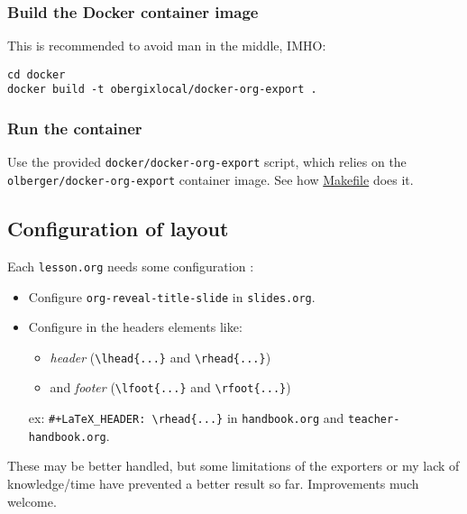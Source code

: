 \documentclass[a4paper]{article}
\begin{document}
\subsubsection{Build the Docker container image}
\label{sec:org113fa77}

This is recommended to avoid man in the middle, IMHO:

\begin{verbatim}
cd docker
docker build -t obergixlocal/docker-org-export .
\end{verbatim}

\subsubsection{Run the container}
\label{sec:orgef349cd}

Use the provided \texttt{docker/docker-org-export} script, which relies on
the \texttt{olberger/docker-org-export} container image. See how \url{Makefile} does it.

\subsection{Configuration of layout}
\label{sec:orga425e8c}

Each \texttt{lesson.org} needs some configuration :
\begin{itemize}
\item Configure \texttt{org-reveal-title-slide} in \texttt{slides.org}.

\item Configure in the headers elements like:
\begin{itemize}
\item \emph{header} (\texttt{\textbackslash{}lhead\{...\}} and \texttt{\textbackslash{}rhead\{...\}})
\item and \emph{footer} (\texttt{\textbackslash{}lfoot\{...\}} and \texttt{\textbackslash{}rfoot\{...\}})
\end{itemize}

ex: \texttt{\#+LaTeX\_HEADER: \textbackslash{}rhead\{...\}} in \texttt{handbook.org} and
  \texttt{teacher-handbook.org}.
\end{itemize}

\begin{NOTES}
These may be better handled, but some limitations of the exporters or
my lack of knowledge/time have prevented a better result so
far. Improvements much welcome.
\end{NOTES}
\end{document}

